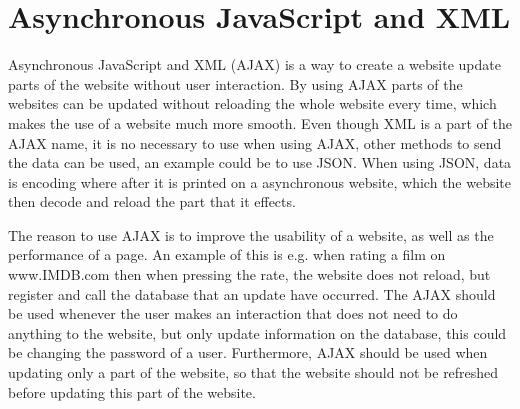 \section{Asynchronous JavaScript and XML}
Asynchronous JavaScript and XML (AJAX) is a way to create a website update parts of the website without user interaction.
By using AJAX parts of the websites can be updated without reloading the whole website every time, which makes the use of a website much more smooth.
Even though XML is a part of the AJAX name, it is no necessary to use when using AJAX, other methods to send the data can be used, an example could be to use JSON.
When using JSON, data is encoding where after it is printed on a asynchronous website, which the website then decode and reload the part that it effects.

The reason to use AJAX is to improve the usability of a website, as well as the performance of a page.
An example of this is e.g. when rating a film on www.IMDB.com then when pressing the rate, the website does not reload, but register and call the database that an update have occurred. 
The AJAX should be used whenever the user makes an interaction that does not need to do anything to the website, but only update information on the database, this could be changing the password of a user. 
Furthermore, AJAX should be used when updating only a part of the website, so that the website should not be refreshed before updating this part of the website.